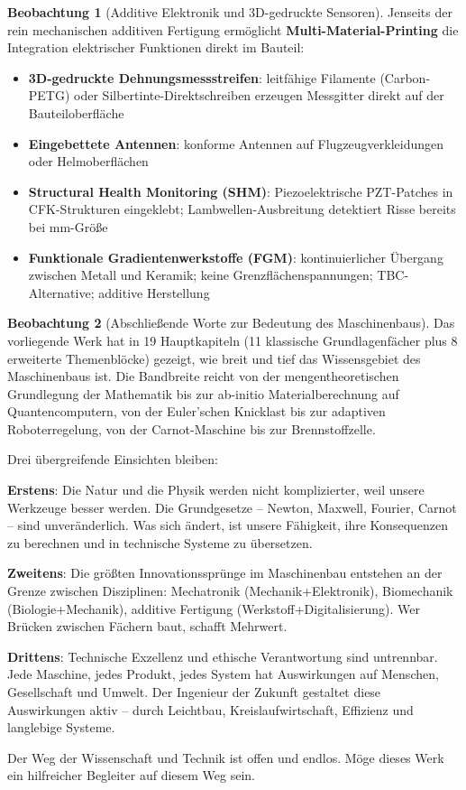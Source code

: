 ﻿\documentclass[a4paper,12pt]{report}
\theoremstyle{definition}
\newtheorem{beobachtung}{Beobachtung}
\begin{document}
\begin{beobachtung}[Additive Elektronik und 3D-gedruckte Sensoren]
Jenseits der rein mechanischen additiven Fertigung ermöglicht
\textbf{Multi-Material-Printing} die Integration elektrischer Funktionen
direkt im Bauteil:
\begin{itemize}
    \item[-] \textbf{3D-gedruckte Dehnungsmessstreifen}: leitfähige
          Filamente (Carbon-PETG) oder Silbertinte-Direktschreiben
          erzeugen Messgitter direkt auf der Bauteiloberfläche
    \item[-] \textbf{Eingebettete Antennen}: konforme Antennen auf
          Flugzeugverkleidungen oder Helmoberflächen
    \item[-] \textbf{Structural Health Monitoring (SHM)}: Piezoelektrische
          PZT-Patches in CFK-Strukturen eingeklebt; Lambwellen-Ausbreitung
          detektiert Risse bereits bei mm-Größe
    \item[-] \textbf{Funktionale Gradientenwerkstoffe (FGM)}:
          kontinuierlicher Übergang zwischen Metall und Keramik;
          keine Grenzflächenspannungen; TBC-Alternative; additive Herstellung
\end{itemize}
\end{beobachtung}

\begin{beobachtung}[Abschließende Worte zur Bedeutung des Maschinenbaus]
Das vorliegende Werk hat in 19 Hauptkapiteln (11 klassische Grundlagenfächer
plus 8 erweiterte Themenblöcke) gezeigt, wie breit und tief das
Wissensgebiet des Maschinenbaus ist. Die Bandbreite reicht von
der mengentheoretischen Grundlegung der Mathematik bis zur
ab-initio Materialberechnung auf Quantencomputern, von der
Euler'schen Knicklast bis zur adaptiven Roboterregelung,
von der Carnot-Maschine bis zur Brennstoffzelle.

Drei übergreifende Einsichten bleiben:

\medskip
\noindent\textbf{Erstens}: Die Natur und die Physik werden nicht
komplizierter, weil unsere Werkzeuge besser werden. Die Grundgesetze --
Newton, Maxwell, Fourier, Carnot -- sind unveränderlich.
Was sich ändert, ist unsere Fähigkeit, ihre Konsequenzen zu berechnen
und in technische Systeme zu übersetzen.

\medskip
\noindent\textbf{Zweitens}: Die größten Innovationssprünge im Maschinenbau
entstehen an der Grenze zwischen Disziplinen: Mechatronik (Mechanik+Elektronik),
Biomechanik (Biologie+Mechanik), additive Fertigung (Werkstoff+Digitalisierung).
Wer Brücken zwischen Fächern baut, schafft Mehrwert.

\medskip
\noindent\textbf{Drittens}: Technische Exzellenz und ethische Verantwortung
sind untrennbar. Jede Maschine, jedes Produkt, jedes System hat
Auswirkungen auf Menschen, Gesellschaft und Umwelt.
Der Ingenieur der Zukunft gestaltet diese Auswirkungen aktiv --
durch Leichtbau, Kreislaufwirtschaft, Effizienz und langlebige Systeme.

\medskip
\noindent Der Weg der Wissenschaft und Technik ist offen und endlos.
Möge dieses Werk ein hilfreicher Begleiter auf diesem Weg sein.
\end{beobachtung}
\end{document}
